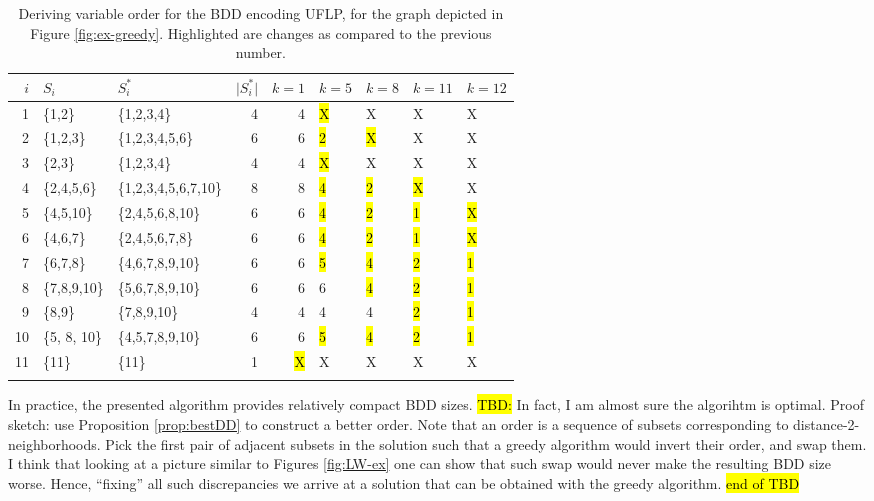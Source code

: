 \documentclass[11pt]{article}
\begin{document}
\begin{example}
\begin{table}[htbp]
\caption{\label{tab:greedy}Deriving variable order for the BDD encoding UFLP, for the graph depicted in Figure \ref{fig:ex-greedy}. Highlighted are changes as compared to the previous number.}
\centering
\begin{tabular}{rllrrllll}
\textcircled{$i$} & \(S_i\) & \(S^*_i\) & \(\vert S^*_i\vert\) & \(k=1\) & \(k=5\) & \(k=8\) & \(k=11\) & \(k=12\)\\
\hline
1 & \{1,2\} & \{1,2,3,4\} & 4 & 4 & \hl{X} & X & X & X\\
2 & \{1,2,3\} & \{1,2,3,4,5,6\} & 6 & 6 & \hl{2} & \hl{X} & X & X\\
3 & \{2,3\} & \{1,2,3,4\} & 4 & 4 & \hl{X} & X & X & X\\
4 & \{2,4,5,6\} & \{1,2,3,4,5,6,7,10\} & 8 & 8 & \hl{4} & \hl{2} & \hl{X} & X\\
5 & \{4,5,10\} & \{2,4,5,6,8,10\} & 6 & 6 & \hl{4} & \hl{2} & \hl{1} & \hl{X}\\
6 & \{4,6,7\} & \{2,4,5,6,7,8\} & 6 & 6 & \hl{4} & \hl{2} & \hl{1} & \hl{X}\\
7 & \{6,7,8\} & \{4,6,7,8,9,10\} & 6 & 6 & \hl{5} & \hl{4} & \hl{2} & \hl{1}\\
8 & \{7,8,9,10\} & \{5,6,7,8,9,10\} & 6 & 6 & 6 & \hl{4} & \hl{2} & \hl{1}\\
9 & \{8,9\} & \{7,8,9,10\} & 4 & 4 & 4 & 4 & \hl{2} & \hl{1}\\
10 & \{5, 8, 10\} & \{4,5,7,8,9,10\} & 6 & 6 & \hl{5} & \hl{4} & \hl{2} & \hl{1}\\
11 & \{11\} & \{11\} & 1 & \hl{X} & X & X & X & X\\
 &  &  &  &  &  &  &  & \\
\end{tabular}
\end{table}

\end{example}

In practice, the presented algorithm provides relatively compact BDD sizes.
\hl{TBD:} In fact, I am almost sure the algorihtm is optimal. Proof sketch: use
Proposition \ref{prop:bestDD} to construct a better order. Note that an order
is a sequence of subsets corresponding to distance-2-neighborhoods. Pick the first
pair of adjacent subsets in the solution such that a greedy algorithm would invert their order,
and swap them. I think that looking at a picture similar to Figures \ref{fig:LW-ex} one can show
that such swap would never make the resulting BDD size worse. Hence, ``fixing'' all such
discrepancies we arrive at a solution that can be obtained with the greedy algorithm. \hl{end of TBD}
\end{document}
